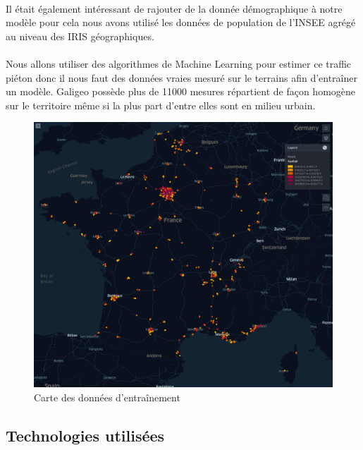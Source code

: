 \paragraph*{}

Il était également intéressant de rajouter de la donnée démographique à notre modèle pour cela nous avons utilisé les données de population de l'INSEE agrégé au niveau des IRIS géographiques.

\paragraph*{}

Nous allons utiliser des algorithmes de Machine Learning pour estimer ce traffic piéton donc il nous faut des données vraies mesuré sur le terrains afin d'entraîner un modèle. Galigeo possède plus de 11000 mesures répartient de façon homogène sur le territoire même si la plus part d'entre elles sont en milieu urbain.

\begin{figure}[H]
    \centering
    \includegraphics[width=\linewidth]{images/graphs/map_of_label_footfall.png}
    \caption{Carte des données d'entraînement}
    \label{fig:footfallmap}
\end{figure}

\subsection{Technologies utilisées}

